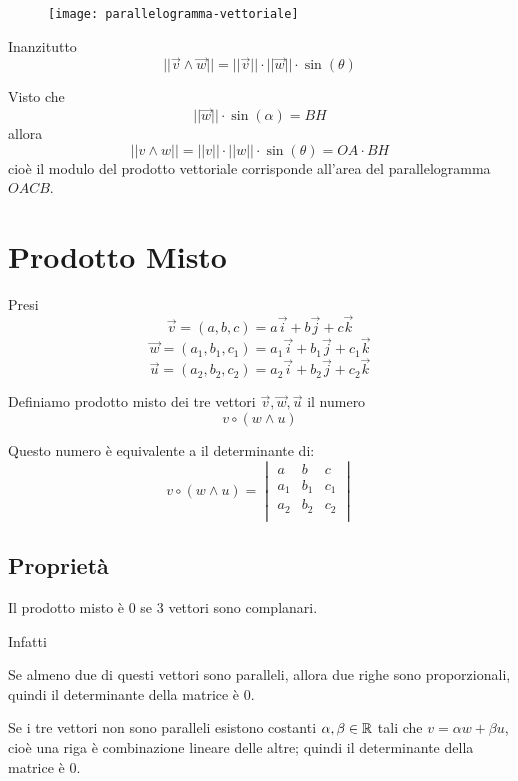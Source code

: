 \begin{figure}[H]
\texttt{[image: parallelogramma-vettoriale]}
\centering
\end{figure}

Inanzitutto
$$ ||\vec{v} \wedge \vec{w}|| = ||\vec{v}||\cdot ||\vec{w}|| \cdot \sin(\theta) $$

Visto che
$$||\vec{w}|| \cdot \sin(\alpha) = BH$$ allora $$||v \wedge w|| = ||v|| \cdot ||w|| \cdot \sin(\theta) = OA \cdot BH$$ cioè il modulo del prodotto vettoriale corrisponde all'area del parallelogramma $OACB$.

\section{Prodotto Misto}

\begin{definition}
Presi
$$\vec{v} = (a,b,c) = a\vec{i}+b\vec{j}+c\vec{k}$$
$$\vec{w} = (a_1,b_1,c_1) = a_1\vec{i}+b_1\vec{j}+c_1\vec{k}$$
$$\vec{u} = (a_2,b_2,c_2) = a_2\vec{i}+b_2\vec{j}+c_2\vec{k}$$

Definiamo prodotto misto dei tre vettori $\vec{v}, \vec{w},\vec{u}$ il numero
$$v \circ (w \wedge u)$$
\end{definition}

Questo numero è equivalente a il determinante di:
$$
v \circ (w \wedge u) =
\begin{vmatrix}
    a       & b       & c       \\
    a_1     & b_1     & c_1     \\
    a_2     & b_2     & c_2     \\
\end{vmatrix}
$$

\subsection{Proprietà}
\begin{property}
Il prodotto misto è 0 se 3 vettori sono complanari.
\end{property}

Infatti
\begin{property}
Se almeno due di questi vettori sono paralleli, allora due righe sono proporzionali, quindi il determinante della matrice è 0.
\end{property}

\begin{property}
Se i tre vettori non sono paralleli esistono costanti $\alpha, \beta \in \mathbb{R}$ tali che $v = \alpha w + \beta u$, cioè una riga è combinazione lineare delle altre; quindi il determinante della matrice è 0.
\end{property}

